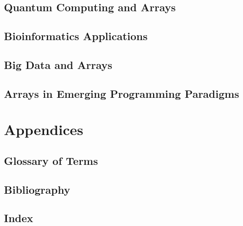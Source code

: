 \documentclass[12pt, oneside]{book}
\begin{document}
	\section{Quantum Computing and Arrays}
	\section{Bioinformatics Applications}
	\section{Big Data and Arrays}
	\section{Arrays in Emerging Programming Paradigms}
	\chapter{Appendices}
	\section{Glossary of Terms}
	\section{Bibliography}
	\section{Index}
	
\printbibliography[heading=bibintoc]

\printindex
\end{document}
